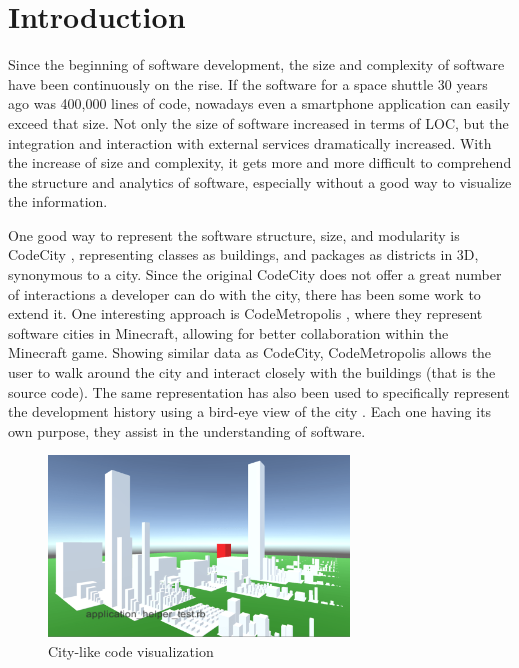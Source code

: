 \documentclass[conference]{IEEEtran}
\begin{document}
\section{Introduction}
Since the beginning of software development, the size and complexity of software have been continuously on the rise.
If the software for a space shuttle 30 years ago was 400,000 lines of code, nowadays even a smartphone application can easily exceed that size.
Not only the size of software increased in terms of LOC, but the integration and interaction with external services dramatically increased.
With the increase of size and complexity, it gets more and more difficult to comprehend the structure and analytics of software, especially without a good way to visualize the information.

One good way to represent the software structure, size, and modularity is \textsf{CodeCity} \cite{Wettel:2011:SSC:1985793.1985868}, representing classes as buildings, and packages as districts in 3D, synonymous to a city.
Since the original \textsf{CodeCity} does not offer a great number of interactions a developer can do with the city, there has been some work to extend it.
One interesting approach is \textsf{CodeMetropolis} \cite{6648194}, where they represent software cities in \textsf{Minecraft}, allowing for better collaboration within the \textsf{Minecraft} game.
Showing similar data as \textsf{CodeCity}, \textsf{CodeMetropolis} allows the user to walk around the city and interact closely with the buildings (that is the source code).
The same representation has also been used to specifically represent the development history using a bird-eye view of the city \cite{Steinbruckner:2010:RDH:1879211.1879239}.
Each one having its own purpose, they assist in the understanding of software.

\begin{figure}[h]
\centering
\includegraphics[width=8cm]{NewROCAT.pdf}
\caption{City-like code visualization}
\label{figure:new-Rocat}
\end{figure}
\end{document}
